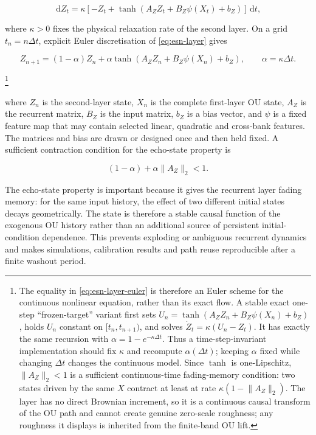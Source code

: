 \documentclass[11pt,a4paper]{article}
\newcommand{\dd}{\,\mathrm{d}}
\begin{document}
\begin{equation}
\dd Z_t
=\kappa\left[-Z_t+\tanh\!\left(A_ZZ_t+B_Z\psi(X_t)+b_Z\right)\right]\dd t,
\label{eq:esn-layer}
\end{equation}

where \(\kappa>0\) fixes the physical relaxation rate of the second layer. On a grid
\(t_n=n\Delta t\), explicit Euler discretisation of \cref{eq:esn-layer} gives

\begin{equation}
Z_{n+1}
=(1-\alpha)Z_n
+\alpha\tanh\!\left(A_ZZ_n+B_Z\psi(X_n)+b_Z\right),
\qquad \alpha=\kappa\Delta t.
\label{eq:esn-layer-euler}
\end{equation}

\footnote{The equality in \cref{eq:esn-layer-euler} is therefore an Euler scheme for the
continuous nonlinear equation, rather than its exact flow. A stable exact one-step
``frozen-target'' variant first sets \(U_n=\tanh(A_ZZ_n+B_Z\psi(X_n)+b_Z)\), holds \(U_n\)
constant on \([t_n,t_{n+1})\), and solves \(\dot Z_t=\kappa(U_n-Z_t)\). It has exactly the
same recursion with \(\alpha=1-e^{-\kappa\Delta t}\). Thus a time-step-invariant
implementation should fix \(\kappa\) and recompute \(\alpha(\Delta t)\); keeping \(\alpha\)
fixed while changing \(\Delta t\) changes the continuous model. Since \(\tanh\) is
one-Lipschitz, \(\lVert A_Z\rVert_2<1\) is a sufficient continuous-time fading-memory
condition: two states driven by the same \(X\) contract at least at rate
\(\kappa(1-\lVert A_Z\rVert_2)\). The layer has no direct Brownian increment, so it is a
continuous causal transform of the OU path and cannot create genuine zero-scale roughness; any
roughness it displays is inherited from the finite-band OU lift.}

where \(Z_n\) is the second-layer state, \(X_n\) is the complete first-layer OU state,
\(A_Z\) is the recurrent matrix, \(B_Z\) is the input matrix, \(b_Z\) is a bias vector, and
\(\psi\) is a fixed feature map that may contain selected linear, quadratic and cross-bank
features. The matrices and bias are drawn or designed once and then held fixed. A sufficient
contraction condition for the echo-state property is

\begin{equation}
(1-\alpha)+\alpha\lVert A_Z\rVert_2<1.
\label{eq:echo-condition}
\end{equation}

The echo-state property is important because it gives the recurrent layer fading memory: for
the same input history, the effect of two different initial states decays geometrically. The
state is therefore a stable causal function of the exogenous OU history rather than an
additional source of persistent initial-condition dependence. This prevents exploding or
ambiguous recurrent dynamics and makes simulations, calibration results and path reuse
reproducible after a finite washout period.
\end{document}
